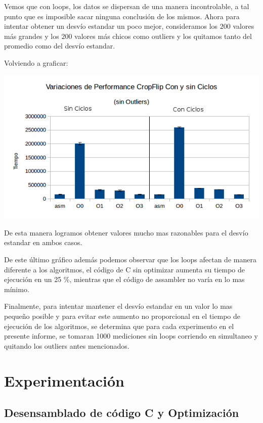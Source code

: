 \documentclass[a4paper]{article}
\begin{document}
Vemos que con loops, los datos se dispersan de una manera incontrolable, a tal punto que es imposible sacar ninguna conclusión de los mismos. Ahora para intentar obtener un desvío estandar un poco mejor, consideramos los $200$ valores más grandes y los $200$ valores más chicos como outliers y los quitamos tanto del promedio como del desvío estandar.

Volviendo a graficar:

\begin{center}
  \includegraphics[scale=0.66]{Graficos1.4/1.3/perSinOut.png}
\end{center}

De esta manera logramos obtener valores mucho mas razonables para el desvío estandar en ambos casos.

De este último gráfico además podemos observar que los loops afectan de manera diferente a los algoritmos, el código de C sin optimizar aumenta su tiempo de ejecución en un 25 \%, mientras que el código de assambler no varía en lo mas mínimo.

Finalmente, para intentar mantener el desvío estandar en un valor lo mas pequeño posible y para evitar este aumento no proporcional en el tiempo de ejecución de los algoritmos, se determina que para cada experimento en el presente informe, se tomaran 1000 mediciones sin loops corriendo en simultaneo y quitando los outliers antes mencionados.

\newpage

\section{Experimentación}

\subsection{Desensamblado de código C y Optimización}
\end{document}
